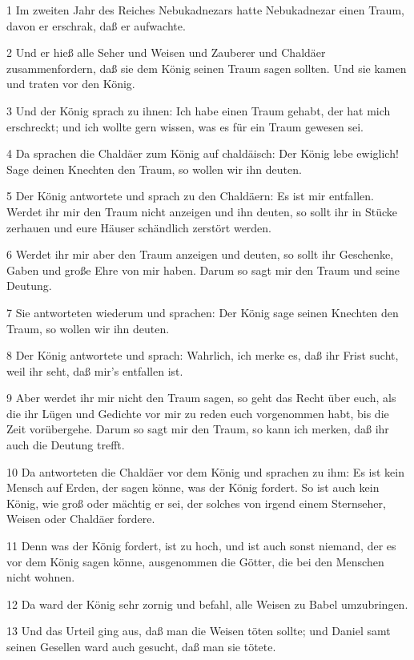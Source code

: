 \par 1 Im zweiten Jahr des Reiches Nebukadnezars hatte Nebukadnezar einen Traum, davon er erschrak, daß er aufwachte.
\par 2 Und er hieß alle Seher und Weisen und Zauberer und Chaldäer zusammenfordern, daß sie dem König seinen Traum sagen sollten. Und sie kamen und traten vor den König.
\par 3 Und der König sprach zu ihnen: Ich habe einen Traum gehabt, der hat mich erschreckt; und ich wollte gern wissen, was es für ein Traum gewesen sei.
\par 4 Da sprachen die Chaldäer zum König auf chaldäisch: Der König lebe ewiglich! Sage deinen Knechten den Traum, so wollen wir ihn deuten.
\par 5 Der König antwortete und sprach zu den Chaldäern: Es ist mir entfallen. Werdet ihr mir den Traum nicht anzeigen und ihn deuten, so sollt ihr in Stücke zerhauen und eure Häuser schändlich zerstört werden.
\par 6 Werdet ihr mir aber den Traum anzeigen und deuten, so sollt ihr Geschenke, Gaben und große Ehre von mir haben. Darum so sagt mir den Traum und seine Deutung.
\par 7 Sie antworteten wiederum und sprachen: Der König sage seinen Knechten den Traum, so wollen wir ihn deuten.
\par 8 Der König antwortete und sprach: Wahrlich, ich merke es, daß ihr Frist sucht, weil ihr seht, daß mir's entfallen ist.
\par 9 Aber werdet ihr mir nicht den Traum sagen, so geht das Recht über euch, als die ihr Lügen und Gedichte vor mir zu reden euch vorgenommen habt, bis die Zeit vorübergehe. Darum so sagt mir den Traum, so kann ich merken, daß ihr auch die Deutung trefft.
\par 10 Da antworteten die Chaldäer vor dem König und sprachen zu ihm: Es ist kein Mensch auf Erden, der sagen könne, was der König fordert. So ist auch kein König, wie groß oder mächtig er sei, der solches von irgend einem Sternseher, Weisen oder Chaldäer fordere.
\par 11 Denn was der König fordert, ist zu hoch, und ist auch sonst niemand, der es vor dem König sagen könne, ausgenommen die Götter, die bei den Menschen nicht wohnen.
\par 12 Da ward der König sehr zornig und befahl, alle Weisen zu Babel umzubringen.
\par 13 Und das Urteil ging aus, daß man die Weisen töten sollte; und Daniel samt seinen Gesellen ward auch gesucht, daß man sie tötete.
